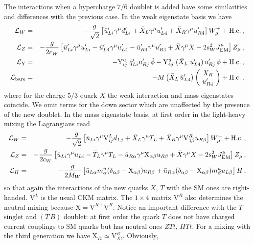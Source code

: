 \documentclass[12pt,a4paper]{article}
\newcommand{\TB}{(T \, B)}
\newcommand{\gm}{\gamma^\mu}
\newcommand{\Wmp}{W_\mu^+}
\newcommand{\Zm}{Z_\mu}
\begin{document}
The interactions when a hypercharge $7/6$ doublet is added have some similarities and differences with the previous case. In the weak eigenstate basis we have
\begin{eqnarray}
\mathcal{L}_W & = & -\frac{g}{\sqrt 2} \left[ \bar u_{Li}' \gm d_{Li}'
 + \bar X_L \gm u_{L4}' + \bar X_R \gm u_{R4}'
  \right] \Wmp + \text{H.c.} \,, \notag \\
%
\mathcal{L}_Z & = & -\frac{g}{2 c_W} \left[ \bar u_{Li}' \gm u_{Li}'
 - \bar u_{L4}' \gm u_{L4}' - \bar u_{R4}' \gm u_{R4}'  + \bar X \gm X 
- 2 s_W^2 J_\text{EM}^\mu \right] \Zm \,, \notag \\
%
\mathcal{L}_\text{Y} & = &
  - \mathrm{Y}_{ij}^u \; \bar q_{Li}' u_{Rj}' \, \tilde \phi
  - \mathrm{Y}_{4j}^u \; (\bar X_L \; \bar u_{L4}') \, u_{Rj}' \, \phi
+ \text{H.c.} \,, \notag \\
%
\mathcal{L}_\text{bare}  & = & - M \left( \bar X_L \, \bar u_{L4}' \right)
\left( \! \begin{array}{c} X_R \\ u_{R4}' \end{array} \! \right) + \text{H.c.} \,,
\end{eqnarray}
where for the charge $5/3$ quark $X$ the weak interaction and mass eigenstates coincide.
We omit terms for the down sector which are unaffected by the presence of the new doublet.
In the mass eigenstate basis, at first order in the light-heavy mixing the Lagrangians read
\begin{eqnarray}
\mathcal{L}_W & = & -\frac{g}{\sqrt 2} \left[
  \bar u_{Li} \gm \mathrm{V}_{ij}^L d_{Lj} + \bar X_L \gm T_L
  + \bar X_R \gm \mathrm{V}_{4\beta}^R u_{R\beta}
 \right] \Wmp + \text{H.c.} \,, \notag \\
%
\mathcal{L}_Z & = & -\frac{g}{2 c_W} \left[
\bar u_{Li} \gm u_{Li} - \bar T_L \gm T_L
- \bar u_{R\alpha} \gm \mathrm{X}_{\alpha \beta} u_{R\beta} 
+ \bar X \gm X - 2 s_W^2 J_\text{EM}^\mu \right] \Zm \,, \notag \\
%
\mathcal{L}_H & = & - \frac{g}{2 M_W} \left[
\bar u_{L\alpha} m_\alpha^u (\delta_{\alpha \beta}-\mathrm{X}_{\alpha \beta}) u_{R\beta}
+ \bar u_{R\alpha} (\delta_{\alpha \beta}-\mathrm{X}_{\alpha \beta}) m_\beta^u u_{L\beta}
\right] H \,,
\end{eqnarray}
so that again the interactions of the new quarks $X$, $T$ with the SM ones are right-handed.
$\mathrm{V}^L$ is the usual CKM matrix.
 The $1 \times 4$ matrix $\mathrm{V}^R$ also determines the neutral mixing because $\mathrm{X} = \mathrm{V}^{R\dagger} \mathrm{V}^R$. Notice an important difference with the $T$ singlet and $\TB$ doublet: at first order the quark $T$ does not have charged current couplings to SM quarks but has neutral ones $ZTt$, $HTt$. For a mixing with the third generation we have $\mathrm{X}_{Tt} \simeq \mathrm{V}_{Xt}^R$. Obviously,
\end{document}
